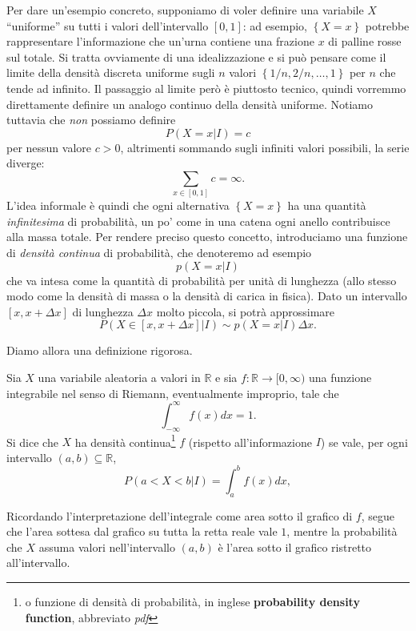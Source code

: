 \documentclass[
  italian,
  letterpaper,
]{book}
\newcommand{\cur}[1]{\left\{ #1 \right\}}
\newcommand{\R}{\mathbb{R}}
\theoremstyle{definition}
\theoremstyle{remark}
\begin{document}
Per dare un'esempio concreto, supponiamo di voler definire una variabile
\(X\) ``uniforme'' su tutti i valori dell'intervallo \([0,1]\): ad
esempio, \(\cur{X = x}\) potrebbe rappresentare l'informazione che
un'urna contiene una frazione \(x\) di palline rosse sul totale. Si
tratta ovviamente di una idealizzazione e si può pensare come il limite
della densità discreta uniforme sugli \(n\) valori
\(\cur{1/n, 2/n, \ldots, 1}\) per \(n\) che tende ad infinito. Il
passaggio al limite però è piuttosto tecnico, quindi vorremmo
direttamente definire un analogo continuo della densità uniforme.
Notiamo tuttavia che \emph{non} possiamo definire \[ P(X = x | I) = c \]
per nessun valore \(c>0\), altrimenti sommando sugli infiniti valori
possibili, la serie diverge: \[ \sum_{x \in [0,1]} c = \infty.\] L'idea
informale è quindi che ogni alternativa \(\cur{X =x}\) ha una quantità
\emph{infinitesima} di probabilità, un po' come in una catena ogni
anello contribuisce alla massa totale. Per rendere preciso questo
concetto, introduciamo una funzione di \emph{densità continua} di
probabilità, che denoteremo ad esempio \[ p(X = x | I)\] che va intesa
come la quantità di probabilità per unità di lunghezza (allo stesso modo
come la densità di massa o la densità di carica in fisica). Dato un
intervallo \([x, x + \Delta x]\) di lunghezza \(\Delta x\) molto
piccola, si potrà approssimare
\[ P(X \in [x, x + \Delta x] | I ) \sim  p(X = x | I) \Delta x.\]

Diamo allora una definizione rigorosa.

Sia \(X\) una variabile aleatoria a valori in \(\R\) e sia
\(f: \R \to [0, \infty)\) una funzione integrabile nel senso di Riemann,
eventualmente improprio, tale che
\[ \int_{-\infty}^\infty f(x) d x = 1.\] Si dice che \(X\) ha densità
continua\footnote{o funzione di densità di probabilità, in inglese
  \textbf{probability density function}, abbreviato \emph{pdf}} \(f\)
(rispetto all'informazione \(I\)) se vale, per ogni intervallo
\((a,b) \subseteq \R\), \[ P( a < X < b | I) = \int_a^b f(x) d x,\]

Ricordando l'interpretazione dell'integrale come area sotto il grafico
di \(f\), segue che l'area sottesa dal grafico su tutta la retta reale
vale \(1\), mentre la probabilità che \(X\) assuma valori
nell'intervallo \((a,b)\) è l'area sotto il grafico ristretto
all'intervallo.
\end{document}
